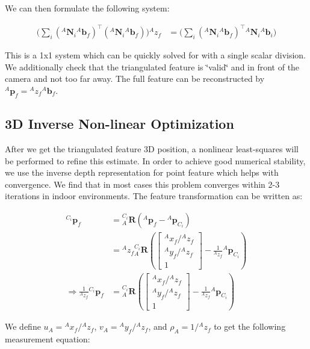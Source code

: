 We can then formulate the following system\+:

\begin{align*} \Big( \sum_i ({}^{A}\mathbf{N}_i{}^A\mathbf{b}_f)^\top ({}^{A}\mathbf{N}_i{}^A\mathbf{b}_f) \Big) {}^{A}z_{f} &= \Big( \sum_i ({}^{A}\mathbf{N}_i{}^A\mathbf{b}_f)^\top {}^{A}\mathbf{N}_i{}^A \mathbf{b}_i \Big) \end{align*}

This is a 1x1 system which can be quickly solved for with a single scalar division. We additionally check that the triangulated feature is \char`\"{}valid\char`\"{} and in front of the camera and not too far away. The full feature can be reconstructed by $ {}^A\mathbf{p}_f = {}^{A}z_{f} {}^A\mathbf{b}_f$.\hypertarget{update-featinit_featinit-nonlinear}{}\subsection{3\+D Inverse Non-\/linear Optimization}\label{update-featinit_featinit-nonlinear}
After we get the triangulated feature 3D position, a nonlinear least-\/squares will be performed to refine this estimate. In order to achieve good numerical stability, we use the inverse depth representation for point feature which helps with convergence. We find that in most cases this problem converges within 2-\/3 iterations in indoor environments. The feature transformation can be written as\+:

\begin{align*} {}^{C_i}\mathbf{p}_f & = {}^{C_i}_A\mathbf{R} \left( {}^A\mathbf{p}_f - {}^A\mathbf{p}_{C_i} \right) \\ &= {}^Az_f {}^{C_i}_A\mathbf{R} \left( \begin{bmatrix} {}^Ax_f/{}^Az_f \\ {}^Ay_f/{}^Az_f \\ 1 \end{bmatrix} - \frac{1}{{}^Az_f} {}^A\mathbf{p}_{C_i} \right) \\ \Rightarrow \frac{1}{{}^Az_f} {}^{C_i}\mathbf{p}_f & = {}^{C_i}_A\mathbf{R} \left( \begin{bmatrix} {}^Ax_f/{}^Az_f \\ {}^Ay_f/{}^Az_f \\ 1 \end{bmatrix} - \frac{1}{{}^Az_f} {}^A\mathbf{p}_{C_i} \right) \end{align*}

We define $u_A = {}^Ax_f/{}^Az_f$, $v_A = {}^Ay_f/{}^Az_f$, and $\rho_A = {1}/{{}^Az_f}$ to get the following measurement equation\+:

